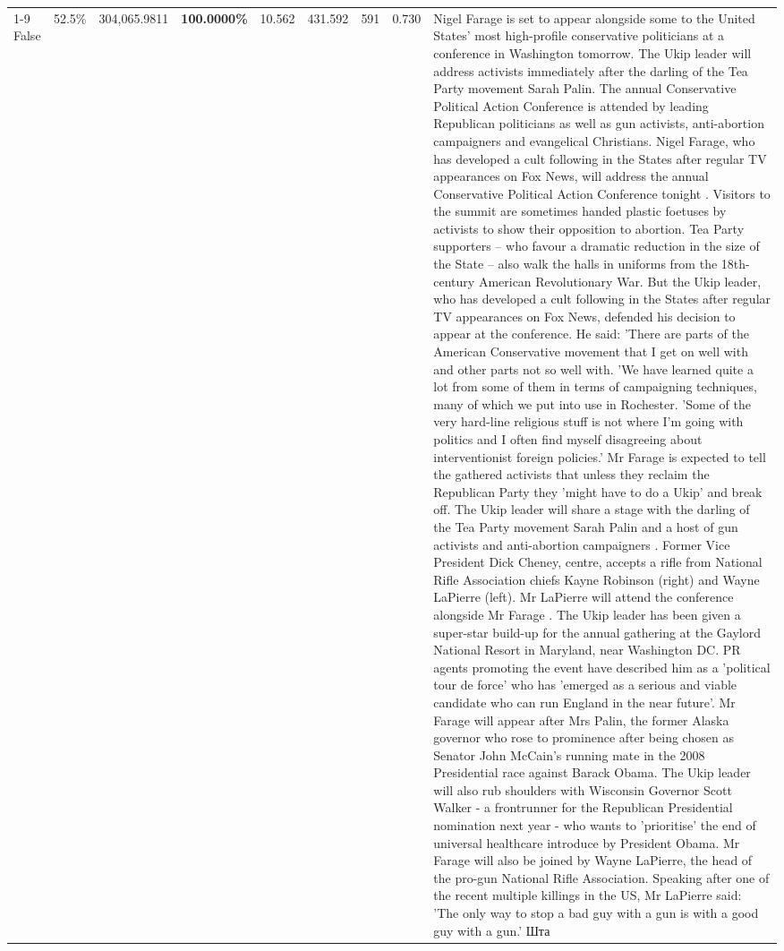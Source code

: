 \begin{table}[H]
\begin{tabular}{lllrlllll}
\cline{1-9}
False & 52.5\% & 304,065.9811 & \bfseries \color{red} 100.0000\% & 10.562 & 431.592 & 591 & 0.730 & Nigel Farage is set to appear alongside some to the United States' most high-profile conservative politicians at a conference in Washington tomorrow. The Ukip leader will address activists immediately after the darling of the Tea Party movement Sarah Palin. The annual Conservative Political Action Conference is attended by leading Republican politicians as well as gun activists, anti-abortion campaigners and evangelical Christians. Nigel Farage, who has developed a cult following in the States after regular TV appearances on Fox News, will address the annual Conservative Political Action Conference tonight . Visitors to the summit are sometimes handed plastic foetuses by activists to show their opposition to abortion. Tea Party supporters – who favour a dramatic reduction in the size of the State – also walk the halls in uniforms from the 18th-century American Revolutionary War. But the Ukip leader, who has developed a cult following in the States after regular TV appearances on Fox News, defended his decision to appear at the conference. He said: 'There are parts of the American Conservative movement that I get on well with and other parts not so well with. 'We have learned quite a lot from some of them in terms of campaigning techniques, many of which we put into use in Rochester. 'Some of the very hard-line religious stuff is not where I'm going with politics and I often find myself disagreeing about interventionist foreign policies.' Mr Farage is expected to tell the gathered activists that unless they reclaim the Republican Party they 'might have to do a Ukip' and break off. The Ukip leader will share a stage with the darling of the Tea Party movement Sarah Palin and a host of gun activists and anti-abortion campaigners . Former Vice President Dick Cheney, centre, accepts a rifle from National Rifle Association chiefs Kayne Robinson (right) and Wayne LaPierre (left). Mr LaPierre will attend the conference alongside Mr Farage . The Ukip leader has been given a super-star build-up for the annual gathering at the Gaylord National Resort in Maryland, near Washington DC. PR agents promoting the event have described him as a 'political tour de force' who has 'emerged as a serious and viable candidate who can run England in the near future'. Mr Farage will appear after Mrs Palin, the former Alaska governor who rose to prominence after being chosen as Senator John McCain's running mate in the 2008 Presidential race against Barack Obama. The Ukip leader will also rub shoulders with Wisconsin Governor Scott Walker - a frontrunner for the Republican Presidential nomination next year - who wants to 'prioritise' the end of universal healthcare introduce by President Obama. Mr Farage will also be joined by Wayne LaPierre, the head of the pro-gun National Rifle Association. Speaking after one of the recent multiple killings in the US, Mr LaPierre said: 'The only way to stop a bad guy with a gun is with a good guy with a gun.' Шта \\

\end{tabular}
\end{table}
